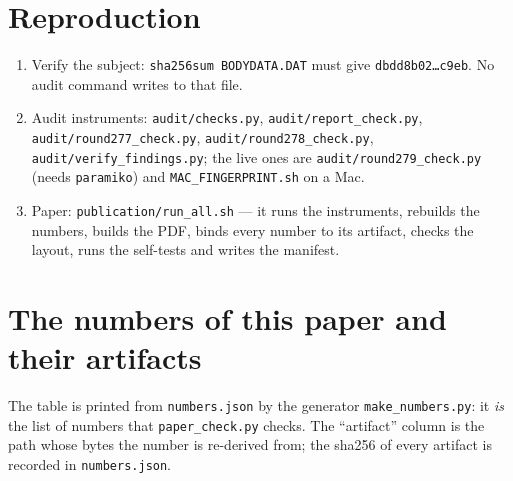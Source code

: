 \documentclass[12pt]{article}
\newcommand{\code}[1]{\texttt{\small #1}}
\newcommand{\lc}[1]{\texttt{\small #1}}
\newcommand{\hx}[1]{\texttt{\footnotesize #1}}
\begin{document}
\section{Reproduction}
\label{sec:repro}

\begin{enumerate}
\item Verify the subject: \lc{sha256su\allowbreak m BODYDA\allowbreak TA.DAT} must give
\hx{dbdd8b02\ldots c9eb}. No audit command writes to that file.
\item Audit instruments: \lc{audit/che\allowbreak cks.py},
\lc{audit/re\allowbreak port\_che\allowbreak ck.py}, \lc{audit/ro\allowbreak und277\_c\allowbreak heck.py},
\lc{audit/ro\allowbreak und278\_c\allowbreak heck.py}, \lc{audit/verify\_find\allowbreak ings.py}; the live ones are
\lc{audit/ro\allowbreak und279\_c\allowbreak heck.py} (needs \code{paramiko}) and
\lc{MAC\_FINGERPRINT.sh} on a Mac.
\item Paper: \lc{publication/run\_all.sh} --- it runs the instruments, rebuilds the
numbers, builds the PDF, binds every number to its artifact, checks the layout, runs the
self-tests and writes the manifest.
\end{enumerate}

\appendix
\section{The numbers of this paper and their artifacts}
\label{sec:appendix}

The table is printed from \code{numbers.json} by the generator \code{make\_numbers.py}: it
\emph{is} the list of numbers that \code{paper\_check.py} checks. The ``artifact'' column is
the path whose bytes the number is re-derived from; the sha256 of every artifact is recorded
in \code{numbers.json}.


\end{document}
